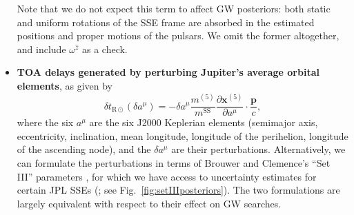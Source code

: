\documentclass{aastex63}
\begin{document}
\begin{itemize}
Note that we do not expect this term to affect GW posteriors: both static and uniform rotations of the SSE frame are absorbed in the estimated positions and proper motions of the pulsars. We omit the former altogether, and include $\omega^{\hat{z}}$ as a check.
%
\item \textbf{TOA delays generated by perturbing Jupiter's average orbital elements}, as given by
\begin{equation}
\label{eq:orbitperturb}
    \delta t_{\mathrm{R}\odot}(\delta a^\mu) = -\delta a^\mu
    \frac{m^{(5)}}{m^\mathrm{SS}} \frac{\partial \mathbf{x}^{(5)}}{\partial a^\mu} \cdot \frac{\mathbf{p}}{c},
\end{equation}
%
where the six $a^\mu$ are the six J2000 Keplerian elements (semimajor axis, eccentricity, inclination, mean longitude, longitude of the perihelion, longitude of the ascending node), and the $\delta a^\mu$ are their perturbations. Alternatively, we can formulate the perturbations in terms of Brouwer and Clemence's ``Set III'' parameters \citep{1961mcm..book.....B}, for which we have access to uncertainty estimates for certain JPL SSEs (\citealt{de434,de438}; see Fig.\ \ref{fig:setIIIposteriors}). The two formulations are largely equivalent with respect to their effect on GW searches.


\end{itemize}
\end{document}
